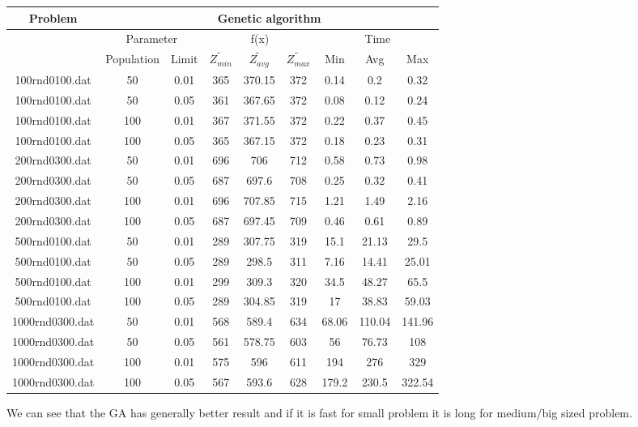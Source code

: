 \documentclass[12pt]{article}
\begin{document}
	\begin{center}
		\begin{tabular}{|c|c|c|c|c|c|c|c|c|}
			\hline
			Problem & \multicolumn{8}{|c|}{Genetic algorithm} \\
			\hline
			 & \multicolumn{2}{|c|}{Parameter} & \multicolumn{3}{|c|}{f(x)} & \multicolumn{3}{|c|}{Time}   \\
			\hline
			& Population & Limit  & $\tilde{Z_{min }}$ & $\tilde{Z_{avg}}$ & $\tilde{Z_{max}}$ & Min & Avg & Max\\
			\hline
			100rnd0100.dat & 50  & 0.01 
			& 365 & 370.15 & 372 & 0.14 & 0.2 & 0.32 \\
			\hline
			100rnd0100.dat & 50  & 0.05
			& 361 & 367.65 & 372 &0.08 &0.12 & 0.24 \\
			\hline
			100rnd0100.dat & 100 & 0.01 
			& 367 & 371.55 & 372 & 0.22& 0.37 & 0.45 \\
			\hline
			100rnd0100.dat & 100 & 0.05 
			& 365 & 367.15 & 372 & 0.18 &  0.23 & 0.31\\
			\hline
			200rnd0300.dat & 50  & 0.01 
			&  696& 706 & 712 & 0.58 &0.73& 0.98 \\
			\hline
			200rnd0300.dat & 50  & 0.05
			& 687 & 697.6 & 708 & 0.25 & 0.32 & 0.41
			\\
			\hline
			200rnd0300.dat & 100 & 0.01
			& 696 & 707.85 & 715 & 1.21 &1.49 & 2.16\\
			\hline
			200rnd0300.dat & 100 & 0.05
			& 687 & 697.45 & 709 & 0.46 & 0.61 & 0.89
			\\
			\hline
			500rnd0100.dat & 50  & 0.01 &
			289 & 307.75 & 319 & 15.1 & 21.13 & 29.5
			\\
			\hline
			500rnd0100.dat & 50  & 0.05
			& 289& 298.5& 311& 7.16& 14.41 & 25.01
			\\
			\hline
			500rnd0100.dat & 100 & 0.01
			& 299 & 309.3 & 320 & 34.5 & 48.27 & 65.5
			\\
			\hline
			500rnd0100.dat & 100 & 0.05 & 289 & 304.85 & 319 & 17 & 38.83 & 59.03
			\\
			\hline
			1000rnd0300.dat & 50  & 0.01 & 568 & 589.4 & 634 & 68.06 & 110.04 & 141.96
			\\
			\hline
			1000rnd0300.dat & 50  & 0.05 & 561 & 578.75 & 603 & 56 & 76.73 & 108 
			\\
			\hline
			1000rnd0300.dat & 100 & 0.01 & 575 & 596 &611 & 194& 276 & 329
			\\
			\hline
			1000rnd0300.dat & 100 & 0.05 & 567 & 593.6 & 628 & 179.2 & 230.5 & 322.54 
			\\
			\hline
		\end{tabular}
	\end{center}
	We can see that the GA has generally better result and if it is fast for small problem it is long for medium/big sized problem.
	
\end{document}
